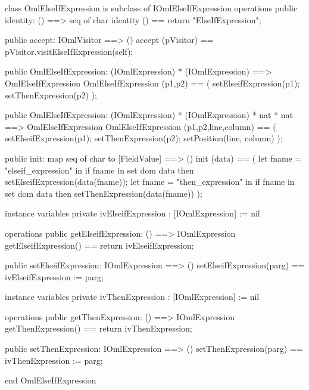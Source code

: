 \begin{vdm_al}
class OmlElseIfExpression is subclass of IOmlElseIfExpression
operations
  public identity: () ==> seq of char
  identity () == return "ElseIfExpression";

  public accept: IOmlVisitor ==> ()
  accept (pVisitor) == pVisitor.visitElseIfExpression(self);

  public OmlElseIfExpression:
    (IOmlExpression) *
    (IOmlExpression) ==> OmlElseIfExpression
  OmlElseIfExpression (p1,p2) == 
    ( setElseifExpression(p1);
      setThenExpression(p2) );

  public OmlElseIfExpression:
    (IOmlExpression) *
    (IOmlExpression) *
    nat *
    nat ==> OmlElseIfExpression
  OmlElseIfExpression (p1,p2,line,column) == 
    ( setElseifExpression(p1);
      setThenExpression(p2);
      setPosition(line, column) );

  public init: map seq of char to [FieldValue] ==> ()
  init (data) ==
    ( let fname = "elseif_expression" in
        if fname in set dom data
        then setElseifExpression(data(fname));
      let fname = "then_expression" in
        if fname in set dom data
        then setThenExpression(data(fname)) );

instance variables
  private ivElseifExpression : [IOmlExpression] := nil

operations
  public getElseifExpression: () ==> IOmlExpression
  getElseifExpression() == return ivElseifExpression;

  public setElseifExpression: IOmlExpression ==> ()
  setElseifExpression(parg) == ivElseifExpression := parg;

instance variables
  private ivThenExpression : [IOmlExpression] := nil

operations
  public getThenExpression: () ==> IOmlExpression
  getThenExpression() == return ivThenExpression;

  public setThenExpression: IOmlExpression ==> ()
  setThenExpression(parg) == ivThenExpression := parg;

end OmlElseIfExpression
\end{vdm_al}

